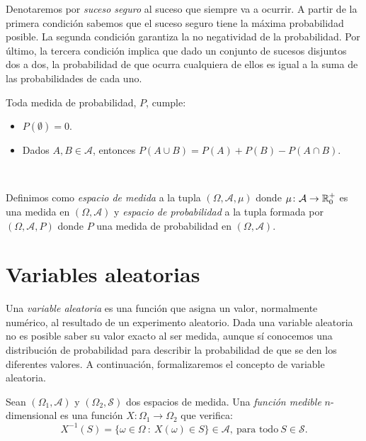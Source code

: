 \documentclass[oneside,openright,titlepage,numbers=noenddot,openany,headinclude,footinclude=true,
cleardoublepage=empty,abstractoff,BCOR=5mm,paper=a4,fontsize=12pt,main=spanish]{scrreprt}
\begin{document}
Denotaremos por \textit{suceso seguro} al suceso que siempre va a ocurrir. A partir de la primera condición sabemos que el suceso seguro tiene la máxima probabilidad posible. La segunda condición garantiza la no negatividad de la probabilidad. Por último, la tercera condición implica que dado un conjunto de sucesos disjuntos dos a dos, la probabilidad de que ocurra cualquiera de ellos es igual a la suma de las probabilidades de cada uno.\\

\begin{proposition} Toda medida de probabilidad, $P$, cumple:

\begin{itemize}
\item $P(\emptyset) = 0$.
\item Dados $A,B \in \mathcal{A}$, entonces $P(A \cup B) = P(A) + P(B) - P(A \cap B)$.
\end{itemize}
\end{proposition}\

\begin{definition}
Definimos como \textit{espacio de medida} a la tupla $(\Omega, \mathcal{A}, \mu)$ donde $\mu \colon \mathcal{A}\to \mathbb{R}_0^+$ es una medida en $(\Omega, \mathcal{A})$ y \textit{espacio de probabilidad} a la tupla formada por $(\Omega, \mathcal{A}, P)$ donde $P$ una medida de probabilidad en $(\Omega, \mathcal{A})$.
\end{definition}

\section{Variables aleatorias}

Una \textit{variable aleatoria} es una función que asigna un valor, normalmente numérico, al resultado de un experimento aleatorio. Dada una variable aleatoria no es posible saber su valor exacto al ser medida, aunque sí conocemos una distribución de probabilidad para describir la probabilidad de que se den los diferentes valores. A continuación, formalizaremos el concepto de variable aleatoria.\\

\begin{definition}
Sean $(\Omega_1,\mathcal{A})$ y $(\Omega_2, \mathcal{S})$ dos espacios de medida. Una \textit{función medible} $n$-dimensional es una función $X\colon \Omega_1 \to \Omega_2$ que verifica: $$X^{-1}(S)=\{\omega \in \Omega \ : \ X(\omega)\in S\} \in \mathcal{A}, \ \text{para todo} \ S \in \mathcal{S}.$$
\end{definition}\
\end{document}
